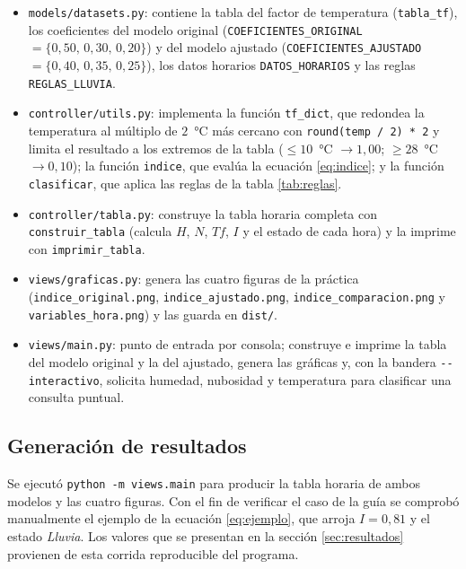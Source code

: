 \documentclass[11pt,a4paper]{article}
\begin{document}
\begin{itemize}[leftmargin=*]
  \item \texttt{models/datasets.py}: contiene la tabla del factor de temperatura
        (\texttt{tabla\_tf}), los coeficientes del modelo original
        (\texttt{COEFICIENTES\_ORIGINAL} $= \{0{,}50,\,0{,}30,\,0{,}20\}$) y del modelo
        ajustado (\texttt{COEFICIENTES\_AJUSTADO} $= \{0{,}40,\,0{,}35,\,0{,}25\}$), los
        datos horarios \texttt{DATOS\_HORARIOS} y las reglas \texttt{REGLAS\_LLUVIA}.
  \item \texttt{controller/utils.py}: implementa la funci\'on \texttt{tf\_dict}, que
        redondea la temperatura al m\'ultiplo de $2$~°C m\'as cercano con
        \texttt{round(temp / 2) * 2} y limita el resultado a los extremos de la tabla
        ($\leq 10$~°C $\rightarrow 1{,}00$; $\geq 28$~°C $\rightarrow 0{,}10$); la
        funci\'on \texttt{indice}, que eval\'ua la ecuaci\'on \eqref{eq:indice}; y la
        funci\'on \texttt{clasificar}, que aplica las reglas de la tabla \ref{tab:reglas}.
  \item \texttt{controller/tabla.py}: construye la tabla horaria completa con
        \texttt{construir\_tabla} (calcula $H$, $N$, $Tf$, $I$ y el estado de cada hora) y
        la imprime con \texttt{imprimir\_tabla}.
  \item \texttt{views/graficas.py}: genera las cuatro figuras de la pr\'actica
        (\texttt{indice\_original.png}, \texttt{indice\_ajustado.png},
        \texttt{indice\_comparacion.png} y \texttt{variables\_hora.png}) y las guarda en
        \texttt{dist/}.
  \item \texttt{views/main.py}: punto de entrada por consola; construye e imprime la
        tabla del modelo original y la del ajustado, genera las gr\'aficas y, con la
        bandera \texttt{-{}-interactivo}, solicita humedad, nubosidad y temperatura para
        clasificar una consulta puntual.
\end{itemize}

\subsection{Generaci\'on de resultados}

Se ejecut\'o \texttt{python -m views.main} para producir la tabla horaria de ambos
modelos y las cuatro figuras. Con el fin de verificar el caso de la gu\'ia se comprob\'o
manualmente el ejemplo de la ecuaci\'on \eqref{eq:ejemplo}, que arroja $I = 0{,}81$ y el
estado \emph{Lluvia}. Los valores que se presentan en la secci\'on \ref{sec:resultados}
provienen de esta corrida reproducible del programa.
\end{document}
